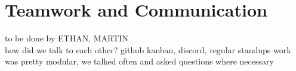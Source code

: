 \section{Teamwork and Communication}
to be done by ETHAN, MARTIN\\
how did we talk to each other?
github kanban, discord, regular standups
work was pretty modular, we talked often and asked questions where necessary
